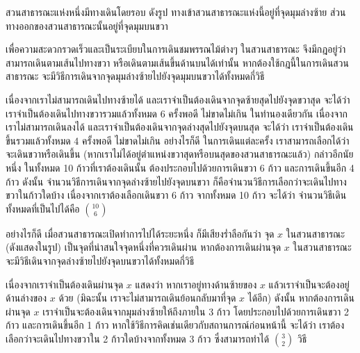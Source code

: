 \begin{example}
สวนสาธารณะแห่งหนึ่งมีทางเดินโดยรอบ ดังรูป \enskip ทางเข้าสวนสาธารณะแห่งนี้อยู่ที่จุดมุมล่างซ้าย ส่วนทางออกของสวนสาธารณะนั้นอยู่ที่จุดมุมบนขวา
\begin{center}
\end{center}
เพื่อความสะดวกรวดเร็วและเป็นระเบียบในการเดินชมพรรณไม้ต่างๆ ในสวนสาธารณะ จึงมีกฎอยู่ว่า สามารถเดินตามเส้นไปทางขวา หรือเดินตามเส้นขึ้นด้านบนได้เท่านั้น \enskip หากต้องใช้กฎนี้ในการเดินสวนสาธารณะ จะมีวิธีการเดินจากจุดมุมล่างซ้ายไปยังจุดมุมบนขวาได้ทั้งหมดกี่วิธี

เนื่องจากเราไม่สามารถเดินไปทางซ้ายได้ และเราจำเป็นต้องเดินจากจุดซ้ายสุดไปยังจุดขวาสุด จะได้ว่า เราจำเป็นต้องเดินไปทางขวารวมแล้วทั้งหมด 6 ครั้งพอดี ไม่ขาดไม่เกิน \enskip ในทำนองเดียวกัน เนื่องจากเราไม่สามารถเดินลงได้ และเราจำเป็นต้องเดินจากจุดล่างสุดไปยังจุดบนสุด จะได้ว่า เราจำเป็นต้องเดินขึ้นรวมแล้วทั้งหมด 4 ครั้งพอดี ไม่ขาดไม่เกิน \enskip อย่างไรก็ดี ในการเดินแต่ละครั้ง เราสามารถเลือกได้ว่าจะเดินขวาหรือเดินขึ้น (หากเราไม่ได้อยู่ตำแหน่งขวาสุดหรือบนสุดของสวนสาธารณะแล้ว) \enskip กล่าวอีกนัยหนึ่ง ในทั้งหมด 10 ก้าวที่เราต้องเดินนั้น ต้องประกอบไปด้วยการเดินขวา 6 ก้าว และการเดินขึ้นอีก 4 ก้าว \enskip ดังนั้น จำนวนวิธีการเดินจากจุดล่างซ้ายไปยังจุดบนขวา ก็คือจำนวนวิธีการเลือกว่าจะเดินไปทางขวาในก้าวใดบ้าง \enskip เนื่องจากเราต้องเลือกเดินขวา 6 ก้าว จากทั้งหมด 10 ก้าว จะได้ว่า จำนวนวิธีเดินทั้งหมดที่เป็นไปได้คือ $\binom{10}{6}$

อย่างไรก็ดี เมื่อสวนสาธารณะเปิดทำการไปได้ระยะหนึ่ง ก็มีเสียงร่ำลือกันว่า จุด $x$ ในสวนสาธารณะ (ดังแสดงในรูป) เป็นจุดที่น่าสนใจจุดหนึ่งที่ควรเดินผ่าน \enskip หากต้องการเดินผ่านจุด $x$ ในสวนสาธารณะ จะมีวิธีเดินจากจุดล่างซ้ายไปยังจุดบนขวาได้ทั้งหมดกี่วิธี

เนื่องจากเราจำเป็นต้องเดินผ่านจุด $x$ แสดงว่า หากเราอยู่ทางด้านซ้ายของ $x$ แล้วเราจำเป็นจะต้องอยู่ด้านล่างของ $x$ ด้วย (มิฉะนั้น เราจะไม่สามารถเดินย้อนกลับมาที่จุด $x$ ได้อีก) \enskip ดังนั้น หากต้องการเดินผ่านจุด $x$ เราจำเป็นจะต้องเดินจากมุมล่างซ้ายให้ถึงภายใน 3 ก้าว โดยประกอบไปด้วยการเดินขวา 2 ก้าว และการเดินขึ้นอีก 1 ก้าว \enskip หากใช้วิธีการคิดเช่นเดียวกับสถานการณ์ก่อนหน้านี้ จะได้ว่า เราต้องเลือกว่าจะเดินไปทางขวาใน 2 ก้าวใดบ้างจากทั้งหมด 3 ก้าว ซึ่งสามารถทำได้ $\binom{3}{2}$ วิธี


\end{example}
